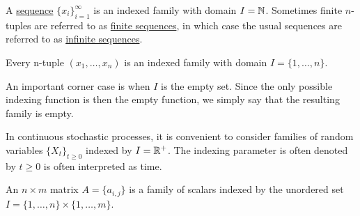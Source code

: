 \begin{definition}\label{def:sequence}
  A \ul{sequence} $\{ x_i \}_{i=1}^\infty$ is an indexed family with domain $I = \mathbb N$. Sometimes finite $n$-tuples are referred to as \ul{finite sequences}, in which case the usual sequences are referred to as \ul{infinite sequences}.
\end{definition}

\begin{example}\label{ex:indexed_families}
  \mbox{}
  \begin{defenum}
    \item Every n-tuple $(x_1, \ldots, x_n)$ is an indexed family with domain $I = \{ 1, \ldots, n \}$.

    \item An important corner case is when $I$ is the empty set. Since the only possible indexing function is then the empty function, we simply say that the resulting family is empty.

    \item In continuous stochastic processes, it is convenient to consider families of random variables $\{ X_t \}_{t \geq 0}$ indexed by $I = \mathbb R^+$. The indexing parameter is often denoted by $t \geq 0$ is often interpreted as time.

    \item An $n \times m$ matrix $A = \{ a_{i,j} \}$ is a family of scalars indexed by the unordered set $I = \{ 1, \ldots, n \} \times \{ 1, \ldots, m \}$.
  \end{defenum}
\end{example}

